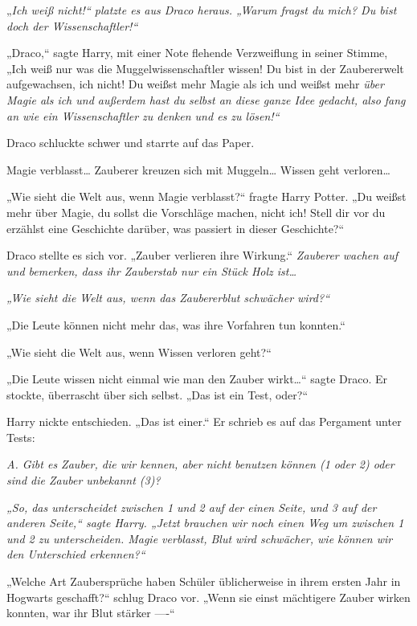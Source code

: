 {„\emph{Ich weiß nicht!“ platzte es aus Draco heraus. „Warum fragst du mich? Du bist doch der Wissenschaftler!“}

„Draco,“ sagte Harry, mit einer Note flehende Verzweiflung in seiner Stimme, „Ich weiß nur was die Muggelwissenschaftler wissen! Du bist in der Zaubererwelt aufgewachsen, ich nicht! Du weißst mehr Magie als ich und weißst mehr \emph{über Magie als ich und außerdem hast du selbst an diese ganze Idee gedacht, also fang an wie ein Wissenschaftler zu denken und es zu lösen!“}

Draco schluckte schwer und starrte auf das Paper.

Magie verblasst… Zauberer kreuzen sich mit Muggeln… Wissen geht verloren…

„Wie sieht die Welt aus, wenn Magie verblasst?“ fragte Harry Potter. „Du weißst mehr über Magie, du sollst die Vorschläge machen, nicht ich! Stell dir vor du erzählst eine Geschichte darüber, was passiert in dieser Geschichte?“

Draco stellte es sich vor. „Zauber verlieren ihre Wirkung.“ \emph{Zauberer wachen auf und bemerken, dass ihr Zauberstab nur ein Stück Holz ist…}

\emph{„Wie sieht die Welt aus, wenn das Zaubererblut schwächer wird?“}

„Die Leute können nicht mehr das, was ihre Vorfahren tun konnten.“

„Wie sieht die Welt aus, wenn Wissen verloren geht?“

„Die Leute wissen nicht einmal wie man den Zauber wirkt…“ sagte Draco. Er stockte, überrascht über sich selbst. „Das ist ein Test, oder?“

Harry nickte entschieden. „Das ist einer.“ Er schrieb es auf das Pergament unter Tests:

\emph{A. Gibt es Zauber, die wir kennen, aber nicht benutzen können (1 oder 2) oder sind die Zauber unbekannt (3)?}

\emph{„So, das unterscheidet zwischen 1 und 2 auf der einen Seite, und 3 auf der anderen Seite,“ sagte Harry. „Jetzt brauchen wir noch einen Weg um zwischen 1 und 2 zu unterscheiden. Magie verblasst, Blut wird schwächer, wie können wir den Unterschied erkennen?“}

„Welche Art Zaubersprüche haben Schüler üblicherweise in ihrem ersten Jahr in Hogwarts geschafft?“ schlug Draco vor. „Wenn sie einst mächtigere Zauber wirken konnten, war ihr Blut stärker ----“

}
